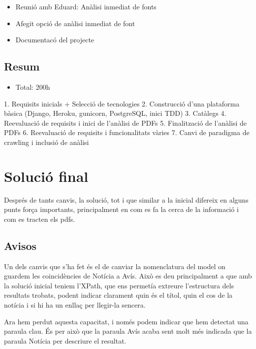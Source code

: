\documentclass{article}
\begin{document}
\begin{itemize}
    \item Reunió amb Eduard: Anàlisi inmediat de fonts
    \item Afegit opció de anàlisi inmediat de font
    \item Documentacó del projecte
\end{itemize}

\subsection{Resum}

\begin{itemize}
    \item Total: 200h
\end{itemize}

1. Requisits inicials + Selecció de tecnologies
2. Construcció d'una plataforma bàsica (Django, Heroku, gunicorn, PostgreSQL, inici TDD)
3. Catàlegs
4. Reevaluació de requisits i inici de l'anàlisi de PDFs
5. Finalització de l'anàlisi de PDFs
6. Reevaluació de requisits i funcionalitats vàries
7. Canvi de paradigma de crawling i inclusió de anàlisi

\newpage

\section{Solució final}

Després de tants canvis, la solució, tot i que similar a la inicial difereix en alguns punts força importants, principalment en com es fa la cerca de la informació i com es tracten els pdfs.

\subsection{Avisos}

Un dels canvis que s'ha fet és el de canviar la nomenclatura del model on guardem les coincidències de Notícia a Avís. Això es deu principalment a que amb la solució inicial teniem l'XPath, que ens permetía extreure l'estructura dels resultats trobats, podent indicar clarament quin és el títol, quin el cos de la notícia i si hi ha un enllaç per llegir-la sencera.

Ara hem perdut aquesta capacitat, i només podem indicar que hem detectat una paraula clau. És per això que la paraula Avís acaba sent molt més indicada que la paraula Notícia per descriure el resultat.
\end{document}
